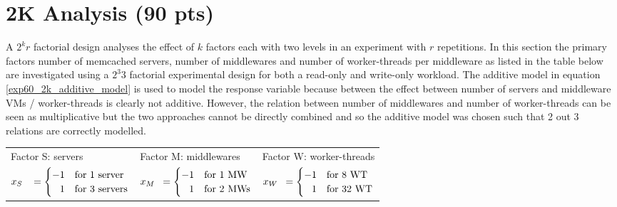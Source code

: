 \documentclass[report.tex]{subfiles}
\begin{document}
\section{2K Analysis (90 pts)}



A $2^{k}r$ factorial design analyses the effect of $k$ factors each with two levels in an experiment with $r$ repetitions. In this section the primary factors number of memcached servers, number of middlewares and number of worker-threads per middleware as listed in the table below are investigated using a $2^{3}3$ factorial experimental design for both a read-only and write-only workload. The additive model in equation \ref{exp60_2k_additive_model} is used to model the response variable because between the effect between number of servers and middleware VMs / worker-threads is clearly not additive. However, the relation between number of middlewares and  number of worker-threads can be seen as multiplicative but the two approaches cannot be directly combined and so the additive model was chosen such that 2 out 3 relations are correctly modelled.

\begin{center}
	\begin{tabular}{l|l|l}
		Factor S: servers & Factor M:  middlewares & Factor W: worker-threads\Tstrut \\
		$x_{S\hphantom{M}} = \begin{cases}-1 & \text{for 1 server}\\ \hphantom{-}1 & \text{for 3 servers}\end{cases}$ &
		$x_{M\hphantom{S}} = \begin{cases}-1 & \text{for 1 MW}\\ \hphantom{-}1 & \text{for 2 MWs}\end{cases}$ & 
		$x_{W\hphantom{S}} = \begin{cases}-1 & \text{for 8 WT}\\ \hphantom{-}1 & \text{for 32 WT}\end{cases}$\Bstrut\\
	\end{tabular} 
\end{center}
\end{document}
